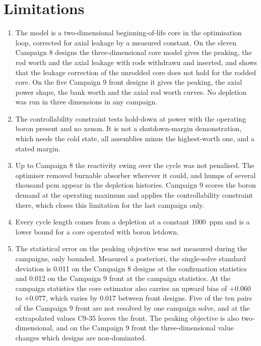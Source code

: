 \section{Limitations}
\label{sec:concl-limits}

\begin{enumerate}
  \item The model is a two-dimensional beginning-of-life core in the
        optimisation loop, corrected for axial leakage by a measured
        constant. On the eleven Campaign 8 designs the
        three-dimensional core model gives the peaking, the rod worth
        and the axial leakage with rods withdrawn and inserted, and
        shows that the leakage correction of the unrodded core does not
        hold for the rodded core. On the five Campaign 9 front designs
        it gives the peaking, the axial power shape, the bank worth and
        the axial rod worth curves. No depletion was run in three
        dimensions in any campaign.

  \item The controllability constraint tests hold-down at power with the operating
        boron present and no xenon. It is not a shutdown-margin
        demonstration, which needs the cold state, all assemblies
        minus the highest-worth one, and a stated margin.

  \item Up to Campaign 8 the reactivity swing over the cycle was not
        penalised. The optimiser removed burnable absorber wherever it
        could, and humps of several thousand pcm appear in the depletion
        histories. Campaign 9 scores the boron demand at the operating
        maximum and applies the controllability constraint there, which closes this
        limitation for the last campaign only.

  \item Every cycle length comes from a depletion at a constant
        \SI{1000}{ppm} and is a lower bound for a core operated with
        boron letdown.

  \item The statistical error on the peaking objective was not
        measured during the campaigns, only bounded. Measured a posteriori,
        the single-solve standard deviation is 0.011 on the Campaign 8
        designs at the confirmation statistics and 0.012 on the
        Campaign 9 front at the campaign statistics. At the campaign
        statistics the core estimator also carries an upward bias of
        $+0.060$ to $+0.077$, which varies by 0.017 between front
        designs. Five of the ten pairs of the Campaign 9 front are not
        resolved by one campaign solve, and at the extrapolated values
        C9-35 leaves the front. The peaking objective is also two-dimensional,
        and on the Campaign 9 front the three-dimensional value changes
        which designs are non-dominated.


\end{enumerate}
